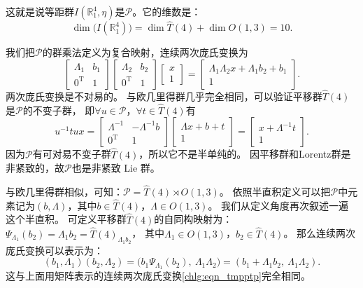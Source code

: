 这就是说等距群$I(\mathbb{R}^4_1,\eta)$是$\mathcal{P}$。它的维数是：
\begin{equation}
    \dim \bigl(I(\mathbb{R}^4_1)\bigr)= \dim   \hat{T}(4) + \dim  O(1,3) = 10 .
\end{equation}

我们把$\mathcal{P}$的群乘法定义为复合映射，连续两次庞氏变换为
\begin{equation}\label{chlg:eqn_tmpptp}
    \begin{bmatrix}  \Lambda_1 & b_1 \\ 0^{\mathrm{T}} & 1  \end{bmatrix}
    \begin{bmatrix}  \Lambda_2 & b_2 \\ 0^{\mathrm{T}} & 1  \end{bmatrix}
    \begin{bmatrix}  x \\ 1 \end{bmatrix}
    =\begin{bmatrix} \Lambda_1 \Lambda_2 x + \Lambda_1 b_2 + b_1 \\  1  \end{bmatrix}.
\end{equation}
两次庞氏变换是不对易的。
与欧几里得群几乎完全相同，可以验证平移群$\hat{T}(4)$
是$\mathcal{P}$的不变子群，
即$\forall u \in \mathcal{P}$，$\forall t \in \hat{T}(4)$有
\begin{equation}
    u^{-1} t u x=
    \begin{bmatrix}  \Lambda^{-1} & -\Lambda^{-1} b \\ 0^{\mathrm{T}} & 1    \end{bmatrix}
    \begin{bmatrix}  \Lambda x + b + t\\  1  \end{bmatrix}
    =\begin{bmatrix} x + \Lambda^{-1} t\\  1  \end{bmatrix}.
\end{equation}
因为$\mathcal{P}$有可对易不变子群$\hat{T}(4)$，所以它不是半单纯的。
因平移群和Lorentz群是非紧致的，故$\mathcal{P}$也是非紧致 Lie 群。

与欧几里得群相似，可知：$\mathcal{P}= \hat{T}(4) \rtimes O(1,3)$。
依照半直积定义可以把$\mathcal{P}$中元素记为$(b,\Lambda)$，其中$b\in \hat{T}(4)$，$\Lambda\in O(1,3)$。
我们从定义角度再次叙述一遍这个半直积。
可定义平移群$\hat{T}(4)$的自同构映射为：
$\Psi_{\Lambda_1}( b_2)=\Lambda_1 b_2 = \hat{T}(4)_{\Lambda_1 b_2}$，
其中$\Lambda_1 \in O(1,3)$，$b_2\in \hat{T}(4)$。
那么连续两次庞氏变换可以表示为：
\begin{equation}
    (b_1, \Lambda_1)(b_2, \Lambda_2)
    =\bigl(b_1 \Psi_{\Lambda_1}( b_2),\ \Lambda_1 \Lambda_2 \bigr)
    =(b_1 + \Lambda_1 b_2 ,\ \Lambda_1 \Lambda_2) .
\end{equation}
这与上面用矩阵表示的连续两次庞氏变换\eqref{chlg:eqn_tmpptp}完全相同。

